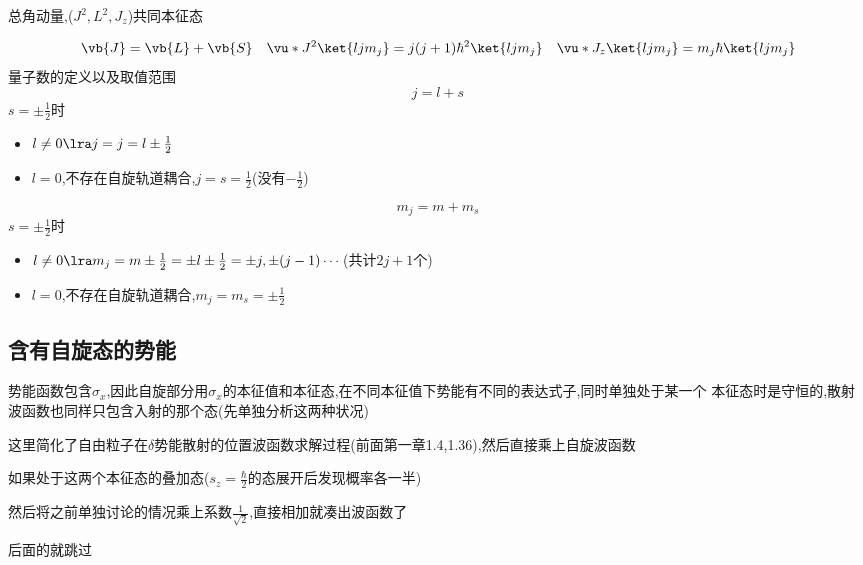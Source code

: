             \begin{formal}
                总角动量,($J^{2},L^{2},J_{z}$)共同本征态

                $$
                \vb{J} = \vb{L} + \vb{S} \quad \vu*{J}^{2}\ket{ljm_{j}} = j(j+1) \hbar^{2} \ket{ljm_{j}} \quad 
                \vu*{J_{z}}\ket{ljm_{j}} = m_{j}\hbar\ket{ljm_{j}}
                $$
                量子数的定义以及取值范围
                $$
                j = l + s
                $$
                $s = \pm\frac{1}{2}$时
                \begin{itemize}
                    \item $l \neq 0 \lra j = j = l \pm \frac{1}{2} $ 
                    \item $l = 0$,不存在自旋轨道耦合,$j=s=\frac{1}{2}$(没有$-\frac{1}{2}$)
                \end{itemize}
               
                $$
                m_{j} = m + m_{s}
                $$
                $s = \pm\frac{1}{2}$时
                \begin{itemize}
                    \item $l \neq 0 \lra m_{j} = m \pm \frac{1}{2} = \pm l \pm \frac{1}{2} = \pm j ,\pm(j-1) \cdots $(共计$2j+1$个) 
                    \item $l = 0$,不存在自旋轨道耦合,$m_{j}=m_{s}=\pm \frac{1}{2}$
                \end{itemize}
            \end{formal}
        
        \subsection{含有自旋态的势能}
            势能函数包含$\sigma_{x}$,因此自旋部分用$\sigma_{x}$的本征值和本征态,在不同本征值下势能有不同的表达式子,同时单独处于某一个
            本征态时是守恒的,散射波函数也同样只包含入射的那个态(先单独分析这两种状况)
            
            这里简化了自由粒子在$\delta$势能散射的位置波函数求解过程(前面第一章1.4,1.36),然后直接乘上自旋波函数

            如果处于这两个本征态的叠加态($s_{z}= \frac{\hbar}{2}$的态展开后发现概率各一半)

            然后将之前单独讨论的情况乘上系数$\frac{1}{\sqrt{2}}$,直接相加就凑出波函数了

            后面的就跳过

















